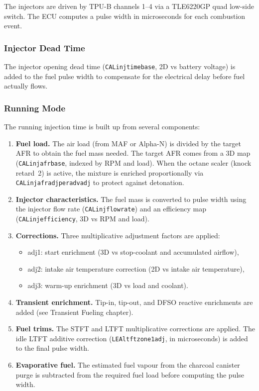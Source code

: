 \documentclass[a4paper,11pt]{article}
\renewcommand{\_}{\oldunderscore\allowbreak}
\begin{document}
The injectors are driven by TPU-B channels 1--4 via a TLE6220GP quad low-side
switch. The ECU computes a pulse width in microseconds for each combustion
event.

\subsubsection*{Injector Dead Time}

The injector opening dead time (\texttt{CAL\_inj\_time\_base}, 2D vs battery voltage)
is added to the fuel
pulse width to compensate for the electrical delay before fuel actually flows.

\subsubsection*{Running Mode}

The running injection time is built up from several components:

\begin{enumerate}
	\item \textbf{Fuel load.} The air load (from MAF or Alpha-N) is divided
	      by the target AFR to obtain the fuel mass needed. The target AFR
	      comes from a 3D map (\texttt{CAL\_inj\_afr\_base}, indexed by RPM
	      and load). When the octane scaler (knock retard~2) is active,
	      the mixture is enriched proportionally via
	      \texttt{CAL\_inj\_afr\_adj\_per\_adv\_adj} to protect against
	      detonation.
	\item \textbf{Injector characteristics.} The fuel mass is converted to
	      pulse width using the injector flow rate
	      (\texttt{CAL\_inj\_flow\_rate}) and an efficiency map
	      (\texttt{CAL\_inj\_efficiency}, 3D vs RPM and load).
	\item \textbf{Corrections.} Three multiplicative adjustment factors are
	      applied:
	      \begin{itemize}
	      \item adj1: start enrichment (3D vs stop-coolant and accumulated
	            airflow),
	      \item adj2: intake air temperature correction (2D vs intake air temperature),
	      \item adj3: warm-up enrichment (3D vs load and coolant).
	      \end{itemize}
	\item \textbf{Transient enrichment.} Tip-in, tip-out, and DFSO reactive
	      enrichments are added (see Transient Fueling chapter).
	\item \textbf{Fuel trims.} The STFT and LTFT multiplicative corrections
	      are applied. The idle LTFT additive correction
	      (\texttt{LEA\_ltft\_zone1\_adj}, in microseconds) is added to the
	      final pulse width.
	\item \textbf{Evaporative fuel.} The estimated fuel vapour from the
	      charcoal canister purge is subtracted from the required fuel load
	      before computing the pulse width.
\end{enumerate}
\end{document}

